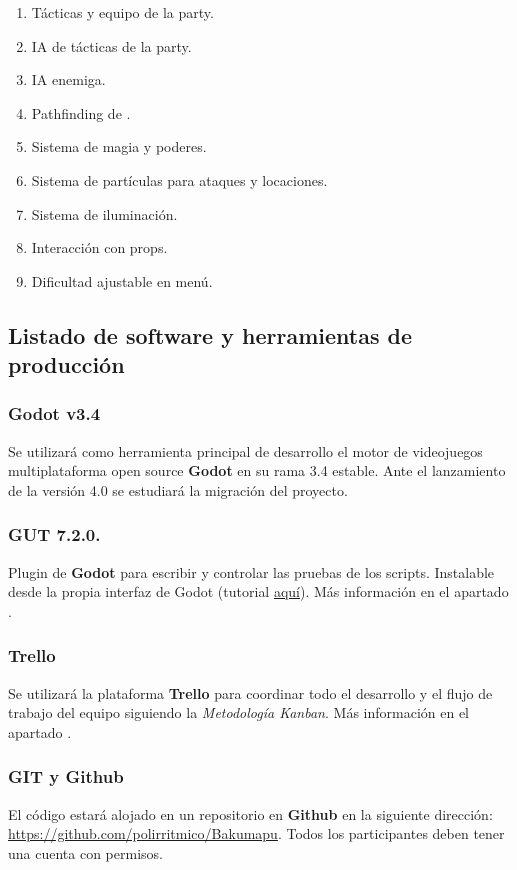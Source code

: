 \begin{enumerate}
\begin{enumerate}[noitemsep]
	\end{enumerate}
	\item Tácticas y equipo de la party.
	\item IA de tácticas de la party.
	\item IA enemiga.
	\item Pathfinding de .
	\item Sistema de magia y poderes.
	\item Sistema de partículas para ataques y locaciones.
	\item Sistema de iluminación.
	\item Interacción con props.
	\item Dificultad ajustable en menú.
\end{enumerate}

\subsection{Listado de software y herramientas de producción}\label{intro:software-y-herramientas}

\subsubsection{Godot v3.4}
Se utilizará como herramienta principal de desarrollo el motor de videojuegos
multiplataforma open source \textbf{Godot} en su rama 3.4 estable. Ante el
lanzamiento de la versión 4.0 se estudiará la migración del proyecto.

\subsubsection*{\small GUT 7.2.0.}
Plugin de \textbf{Godot} para escribir y controlar las pruebas de los scripts.
Instalable desde la propia interfaz de Godot (tutorial
\href{https://www.youtube.com/watch?v=5DrhMiuLRl0}{aquí}). Más información en
el apartado .

\subsubsection{Trello}
Se utilizará la plataforma \textbf{Trello} para coordinar todo el desarrollo y
el flujo de trabajo del equipo siguiendo la \emph{Metodología Kanban}. Más
información en el apartado .

\subsubsection{GIT y Github}
El código estará alojado en un repositorio  en \textbf{Github} en la
siguiente dirección: \url{https://github.com/polirritmico/Bakumapu}. Todos los
participantes deben tener una cuenta con permisos.

